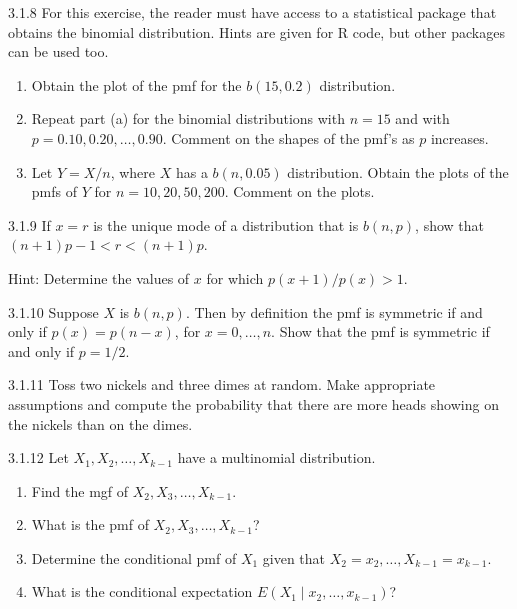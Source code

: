 \begin{exercise}{3.1.8}
For this exercise, the reader must have access to a statistical package that obtains the binomial distribution. Hints are given for R code, but other packages can be used too.
\begin{enumerate}
\item Obtain the plot of the pmf for the $b(15, 0.2)$ distribution.
\item Repeat part (a) for the binomial distributions with $n = 15$ and with $p = 0.10, 0.20, \ldots, 0.90$. Comment on the shapes of the pmf's as $p$ increases.
\item Let $Y = X/n$, where $X$ has a $b(n, 0.05)$ distribution. Obtain the plots of the pmfs of $Y$ for $n = 10, 20, 50, 200$. Comment on the plots.
\end{enumerate}
\end{exercise}

\begin{exercise}{3.1.9}
If $x = r$ is the unique mode of a distribution that is $b(n,p)$, show that $(n+1)p - 1 < r < (n+1)p$.

Hint: Determine the values of $x$ for which $p(x+1)/p(x) > 1$.
\end{exercise}

\begin{exercise}{3.1.10}
Suppose $X$ is $b(n,p)$. Then by definition the pmf is symmetric if and only if $p(x) = p(n-x)$, for $x = 0, \ldots, n$. Show that the pmf is symmetric if and only if $p = 1/2$.
\end{exercise}

\begin{exercise}{3.1.11}
Toss two nickels and three dimes at random. Make appropriate assumptions and compute the probability that there are more heads showing on the nickels than on the dimes.
\end{exercise}

\begin{exercise}{3.1.12}
Let $X_1, X_2, \ldots, X_{k-1}$ have a multinomial distribution.
\begin{enumerate}
\item Find the mgf of $X_2, X_3, \ldots, X_{k-1}$.
\item What is the pmf of $X_2, X_3, \ldots, X_{k-1}$?
\item Determine the conditional pmf of $X_1$ given that $X_2 = x_2, \ldots, X_{k-1} = x_{k-1}$.
\item What is the conditional expectation $E(X_1 \mid x_2, \ldots, x_{k-1})$?
\end{enumerate}
\end{exercise}

